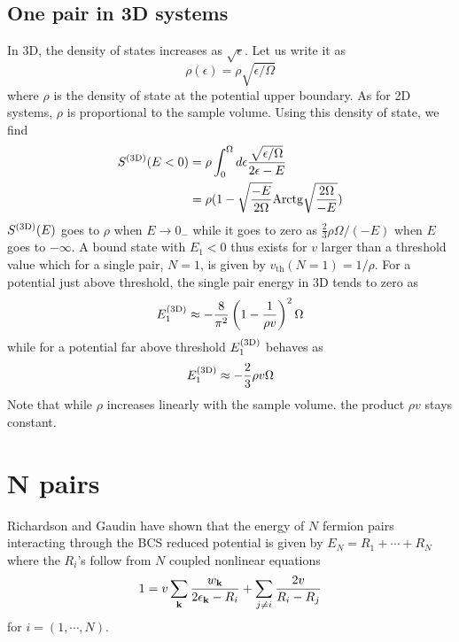 \documentclass[aps,prb,showpacs,3p,twocolumn]{elsarticle}
\begin{document}
\subsection{One pair in 3D systems}
In 3D, the density of states increases as $\sqrt{\epsilon}$. Let us write it as 
\begin{equation}
\rho(\epsilon)=\rho\sqrt{\epsilon/\Omega}
\label{eq:}
\end{equation}
where $\rho$ is the density of state at the potential upper boundary. As for 2D systems, $\rho$ is proportional to the sample volume.   Using this density of state, we find
\begin{equation}
\begin{split}
S^{{\text{(3D)}}}(E<0)&=\rho\int_0^{\Omega}{}d\epsilon\frac{\sqrt{\epsilon/\Omega}}{2\epsilon-E}\\
	&=\rho(1-\sqrt{\frac{-E}{2\Omega}}\text{Arctg}\sqrt{\frac{2\Omega}{-E}})
\label{eq:}
\end{split}
\end{equation}
$S^{{\text{(3D)}}}(E)$ goes to $\rho$ when $E\rightarrow0_-$ while it goes to zero as $\frac{2}{3}\rho\Omega/(-E)$ when $E$ goes to $-\infty$. 
A bound state with $E_1<0$ thus exists for $v$ larger than a threshold value which for a single pair, $N=1$, is given by  $v_{\text{th}}(N=1)=1/\rho$.  For a potential just above threshold, the single pair energy in 3D tends to zero as 
\begin{equation}
E_1^{{\text{(3D)}}}\approx-\frac{8}{\pi^2}\left(1-\frac{1}{\rho{}v}\right)^2\Omega
\label{eq:E3Dsmall}
\end{equation}
while for a potential far above threshold $E_1^{{\text{(3D)}}}$ behaves as 
\begin{equation}
E_1^{{\text{(3D)}}}\approx-\frac{2}{3}\rho{v}\Omega
\label{eq:E3Dlarge}
\end{equation}
Note that while $\rho$ increases linearly with the sample volume.  the product $\rho{v}$ stays constant. 

\section{N pairs\label{sec:NPair}}
Richardson \cite{Richardson1} and Gaudin \cite{gaudin} have shown that the energy of $N$ fermion pairs interacting through the BCS reduced potential  is  given by $E_N=R_1+\cdots+R_N$ where the $R_i$'s follow from $N$ coupled nonlinear equations 
\begin{equation}
 1=v\sum_{\mathbf{k}}\frac{w_{\mathbf{k}}}{2\epsilon_{\mathbf{k}}-R_i}+\sum_{j\neq{}i}\frac{2v}{R_i-R_j}
\end{equation}
{for} $i=(1,\cdots,N)$.
\end{document}
